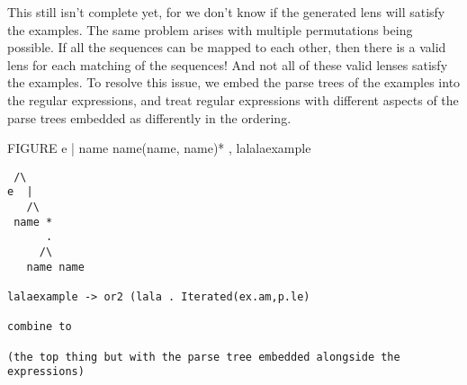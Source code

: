 This still isn't complete yet, for we don't know if the generated lens will
satisfy the examples.  The same problem arises with multiple permutations
being possible.  If all the sequences can be mapped to each other, then there is
a valid lens for each matching of the sequences!  And not all of these
valid lenses satisfy the examples.
To resolve this issue, we embed the parse trees of the examples into the
regular expressions, and treat regular expressions with different aspects of the
parse trees embedded as differently in the ordering.

FIGURE
e | name name(name, name)* , lalalaexample

\begin{lstlisting}
 /\
e  |
   /\
 name *
      .
     /\
   name name

lalaexample -> or2 (lala . Iterated(ex.am,p.le)

combine to

(the top thing but with the parse tree embedded alongside the expressions)
\end{lstlisting}




